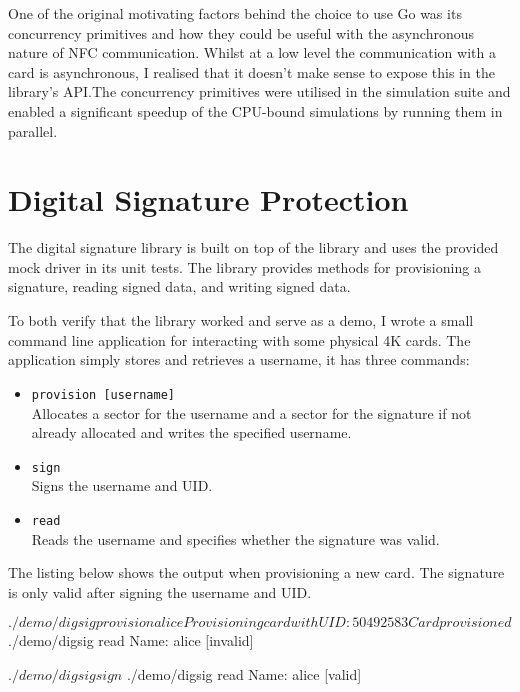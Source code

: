 \documentclass[dissertation.tex]{subfiles}
\begin{document}
  One of the original motivating factors behind the choice to use Go was its concurrency primitives and how they could be useful with the asynchronous nature of NFC communication. Whilst at a low level the communication with a card is asynchronous, I realised that it doesn't make sense to expose this in the library's API.\@ The concurrency primitives were utilised in the simulation suite and enabled a significant speedup of the CPU-bound simulations by running them in parallel.


  \section{Digital Signature Protection}

  The digital signature library is built on top of the \mifare{} library and uses the provided mock driver in its unit tests. The library provides methods for provisioning a signature, reading signed data, and writing signed data.

  To both verify that the library worked and serve as a demo, I wrote a small command line application for interacting with some physical \mifare{} 4K cards. The application simply stores and retrieves a username, it has three commands:

  \begin{itemize}
    \item \texttt{provision [username]} \\
      Allocates a sector for the username and a sector for the signature if not already allocated and writes the specified username.
    \item \texttt{sign} \\
      Signs the username and UID.\@
    \item \texttt{read} \\
      Reads the username and specifies whether the signature was valid.
  \end{itemize}

  The listing below shows the output when provisioning a new card. The signature is only valid after signing the username and UID.\@

  \begin{code}[numbers=none,gobble=0]{{}}
    $ ./demo/digsig provision alice
    Provisioning card with UID: 50492583
    Card provisioned

    $ ./demo/digsig read
    Name: alice [invalid]

    $ ./demo/digsig sign

    $ ./demo/digsig read
    Name: alice [valid]
  \end{code}
\end{document}
